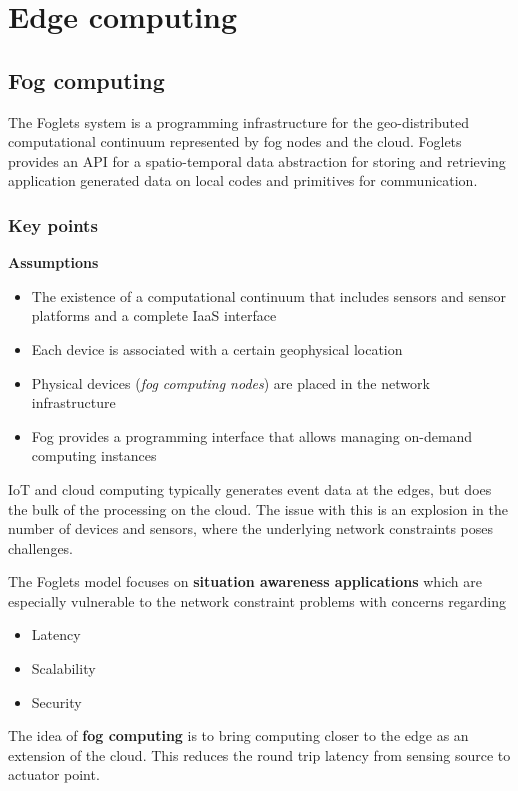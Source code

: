 \documentclass{sty/SizheArticle}
\begin{document}
\section{Edge computing}
\subsection{Fog computing}
The Foglets system is a programming infrastructure for the geo-distributed
computational continuum represented by fog nodes and the cloud. Foglets provides
an API for a spatio-temporal data abstraction for storing and retrieving
application generated data on local codes and primitives for communication.

\subsubsection{Key points}
\textbf{Assumptions}
\begin{itemize}
\item The existence of a computational continuum that includes sensors
and sensor platforms and a complete IaaS interface
\item Each device is associated with a certain geophysical location
\item Physical devices (\textit{fog computing nodes}) are placed in the
network infrastructure
\item Fog provides a programming interface that allows managing on-demand
computing instances
\end{itemize}
IoT and cloud computing typically generates event data at the edges, but
does the bulk of the processing on the cloud. The issue with this is
an explosion in the number of devices and sensors, where the underlying
network constraints poses challenges.

The Foglets model focuses on \textbf{situation awareness applications} which
are especially vulnerable to the network constraint problems with
concerns regarding
\begin{itemize}
\item Latency
\item Scalability
\item Security
\end{itemize}

The idea of \textbf{fog computing} is to bring computing closer to the edge
as an extension of the cloud. This reduces the round trip latency from
sensing source to actuator point.
\end{document}
